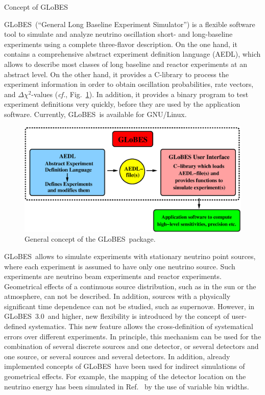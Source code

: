 \documentclass[12pt,a4paper]{article}
\makeatletter
\newcommand{\capdef}{}
\newcommand{\mycaption}[2][\capdef]{\renewcommand{\capdef}{#2}%
       \caption[#1]{{\footnotesize #2}}}
\renewcommand{\section}{\@startsection{section}{1}{0em}{-\baselineskip}%
{\baselineskip}{\normalfont\large\bfseries}}
\newcommand{\cf}{{\it cf.}}
\newcommand{\fig}{Fig.}
\newcommand{\Ref}{Ref.}
\newcommand{\GLOBES}{{\sf GLoBES}}
\newcommand{\GLOBESN}{{\sf GLoBES~3.0}}
\newcommand{\AEDL}{{\sf AEDL}}
\newcommand{\figu}[1]{\fig~\ref{fig:#1}}
\makeatother
\begin{document}
\section{Concept of \GLOBES }

\GLOBES\ (``General Long Baseline Experiment Simulator'') is a flexible
software tool to simulate and analyze neutrino oscillation 
short- and long-baseline experiments using a 
complete three-flavor description. On the
one hand, it contains a comprehensive abstract experiment definition
language (\AEDL ), which allows to describe 
most classes of long baseline and reactor experiments
at an abstract level. On the other hand, it provides a C-library to 
process the experiment information in order to obtain oscillation
probabilities, rate vectors, and $\Delta \chi^2$-values (\cf, \figu{GLOBES}). 
In addition, it provides a binary program to test experiment
definitions very quickly, before they are used by the application software.
Currently, \GLOBES\ is available for GNU/Linux. 

\begin{figure}[t]
\begin{center}
\includegraphics[width=14cm]{GLOBES}
\end{center}
\mycaption{\label{fig:GLOBES} General concept of the \GLOBES\ package.}
\end{figure}

\GLOBES\ allows to simulate experiments with stationary neutrino point 
sources, where each experiment is assumed to have only one neutrino source.
Such experiments are neutrino beam experiments and reactor experiments. 
Geometrical effects of a continuous source distribution, such as in the sun or the 
atmosphere, can not be described. In addition, sources with a physically 
significant time dependence can not be studied, such as  supernov\ae. 
However, in \GLOBESN\ and higher, new flexibility is introduced by the
concept of user-defined systematics. This new feature allows the cross-definition
of systematical errors over different experiments. In principle, 
this mechanism can be used for the combination of several discrete sources
and one detector, or several detectors and one source, or several sources and
several detectors. In addition, already implemented
concepts of \GLOBES\ have been used for indirect simulations of geometrical
effects. For example, the mapping of the detector location on the neutrino
energy has been simulated in \Ref~\cite{Rolinec:2006xr} by the use of
variable bin widths.
\end{document}
